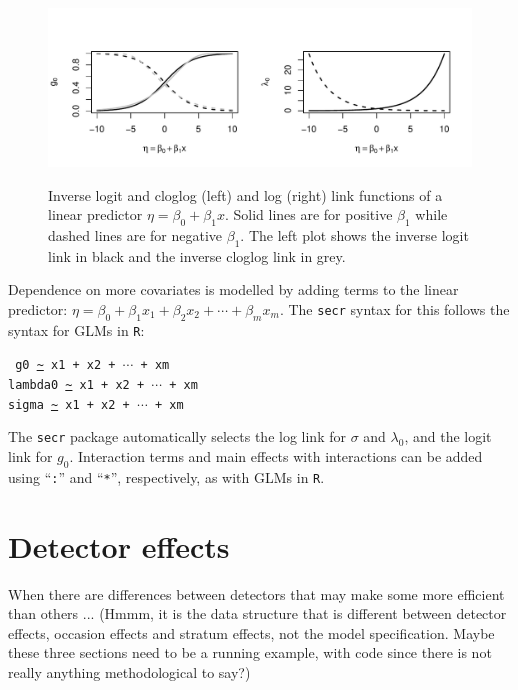 \documentclass[graybox,envcountchap,sectrefs]{SpringerStyleFiles/styles/svmono}\usepackage[]{graphicx}\usepackage[]{color}
\begin{document}
\begin{figure}[ht]
\caption{\small Inverse logit and cloglog (left) and log (right) link functions of a linear predictor $\eta=\beta_0+\beta_1 x$. Solid lines are for positive $\beta_1$ while dashed lines are for negative $\beta_1$. The left plot shows the inverse logit link in black and the inverse cloglog link in grey.}
\centering
\vspace{-24pt}
\includegraphics[width=12cm]{keepfigure/linkfuns.pdf}
\label{fig:ERdetfun.linkfuns}
\end{figure}

Dependence on more covariates is modelled by adding terms to the linear predictor: $\eta=\beta_0 + \beta_1 x_1 + \beta_2 x_2 + \cdots + \beta_m x_m$. The \texttt{secr} syntax for this follows the syntax for GLMs in \texttt{R}:
\noindent
{\small
\begin{svgraybox}
\texttt{
g0 \url{~} x1 + x2 + $\cdots$ + xm \\
lambda0 \url{~} x1 + x2 + $\cdots$ + xm \\
sigma \url{~} x1 + x2 + $\cdots$ + xm 
}
\end{svgraybox}
}
\noindent
The \texttt{secr} package automatically selects the log link for $\sigma$ and $\lambda_0$, and the logit link for $g_0$. Interaction terms and main effects with interactions can be added using ``\texttt{:}'' and ``\texttt{*}'', respectively, as with GLMs in \texttt{R}.



\section{Detector effects}

When there are differences between detectors that may make some more efficient than others ... (Hmmm, it is the data structure that is different between detector effects, occasion effects and stratum effects, not the model specification. Maybe these three sections need to be a running example, with code since there is not really anything methodological to say?)
\end{document}
